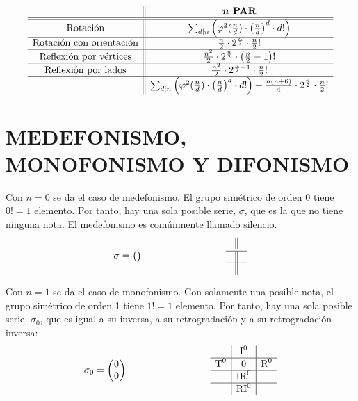 		$$\begin{array}{c||c}
		&\textbf{\textit{n} PAR}\\\hline\hline
		\text{Rotación}&\sum_{d|n}\left(\varphi^2(\frac{n}{d})\cdot\left(\frac{n}{d}\right)^d\cdot d!\right)\\\hline
		\text{Rotación con orientación}&\frac{n}{2}\cdot2^{\frac{n}{2}}\cdot\frac{n}{2}!\\\hline
		\text{Reflexión por vértices}&\frac{n^2}{2}\cdot2^{\frac{n}{2}}\cdot\left(\frac{n}{2}-1\right)!\\\hline
		\text{Reflexión por lados}&\frac{n^2}{2}\cdot2^{\frac{n}{2}-1}\cdot\frac{n}{2}!\\\hline
		&\sum_{d|n}\left(\varphi^2(\frac{n}{d})\cdot\left(\frac{n}{d}\right)^d\cdot d!\right)+\frac{n(n+6)}{4}\cdot2^{\frac{n}{2}}\cdot\frac{n}{2}!\\
		\end{array}$$
		\def\arraystretch{1}
		
	\section{MEDEFONISMO, MONOFONISMO Y DIFONISMO}
	\label{monodi}
		Con $n=0$ se da el caso de medefonismo. El grupo simétrico de orden 0 tiene $0!=1$ elemento. Por tanto, hay una sola posible serie, $\sigma$, que es la que no tiene ninguna nota. El medefonismo es comúnmente llamado silencio.
		$$\sigma=\left(\begin{matrix}\\\end{matrix}\right)\hspace{3cm}\begin{array}{l||r}&\\\hline\hline&\\\hline&\end{array}$$
	
		Con $n=1$ se da el caso de monofonismo. Con solamente una posible nota, el grupo simétrico de orden 1 tiene $1!=1$ elemento. Por tanto, hay una sola posible serie, $\sigma_0$, que es igual a su inversa, a su retrogradación y a su retrogradación inversa:
		$$\sigma_0=\left(\begin{matrix}0\\0\end{matrix}\right)\hspace{3cm}\begin{array}{l|c|r}&\text{I}^{0}&\\\hline\text{T}^{0}&0&\text{R}^{0}\\\hline&\text{IR}^{0}&\\\hline&\text{RI}^{0}&\end{array}$$
	
